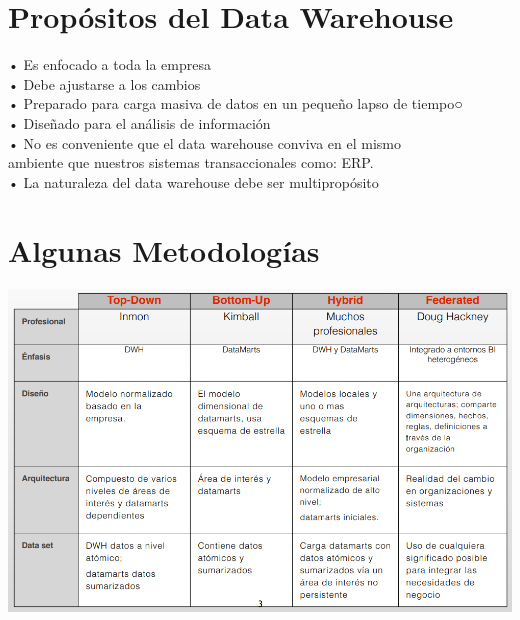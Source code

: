 \section{Propósitos del Data Warehouse}
•	Es enfocado a toda la empresa\\
•	Debe ajustarse a los cambios\\
•	Preparado para carga masiva de datos en un pequeño lapso de tiempo○\\
•	Diseñado para el análisis de información\\
•	No es conveniente que el data warehouse conviva en el mismo\\ ambiente que nuestros sistemas transaccionales como: ERP.\\
•	La naturaleza del data warehouse debe ser multipropósito\\

\section{Algunas Metodologías}

\begin{center}
\includegraphics[width=16cm]{./Imagenes/image009}
\end{center}
\newpage


